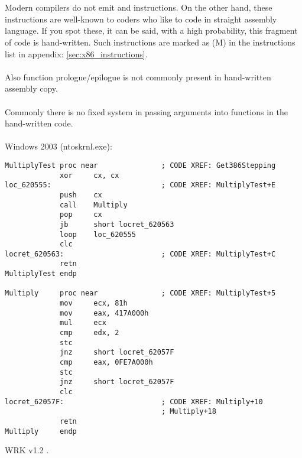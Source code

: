 \section{}

{Modern compilers do not emit  and  instructions.
On the other hand, these instructions are well-known to coders who like to code in straight assembly language.
If you spot these, it can be said, with a high probability, this fragment of code is hand-written.
Such instructions are marked as (M) in the instructions list in appendix: \ref{sec:x86_instructions}.}\\
\\
{Also function prologue/epilogue is not commonly present in hand-written assembly copy.}\\
\\
{Commonly there is no fixed system in passing arguments into functions in the hand-written
code}.\\
\\
 Windows 2003 
(ntoskrnl.exe):

\begin{lstlisting}
MultiplyTest proc near               ; CODE XREF: Get386Stepping
             xor     cx, cx
loc_620555:                          ; CODE XREF: MultiplyTest+E
             push    cx
             call    Multiply
             pop     cx
             jb      short locret_620563
             loop    loc_620555
             clc
locret_620563:                       ; CODE XREF: MultiplyTest+C
             retn
MultiplyTest endp

Multiply     proc near               ; CODE XREF: MultiplyTest+5
             mov     ecx, 81h
             mov     eax, 417A000h
             mul     ecx
             cmp     edx, 2
             stc
             jnz     short locret_62057F
             cmp     eax, 0FE7A000h
             stc
             jnz     short locret_62057F
             clc
locret_62057F:                       ; CODE XREF: Multiply+10
                                     ; Multiply+18
             retn
Multiply     endp
\end{lstlisting}

\ac{WRK} v1.2 
.
